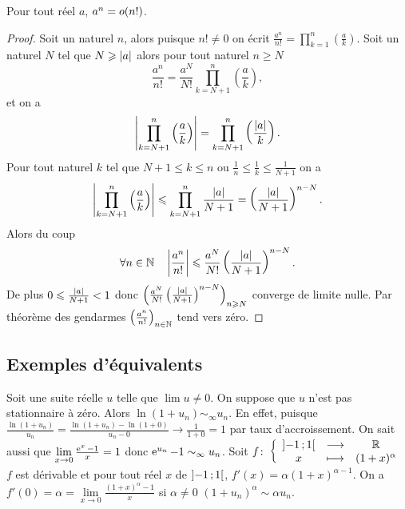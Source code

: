 \begin{prop}
  Pour tout réel \(a\), \(a^n=o\mathopen{}\left(n!\right)\).
\end{prop}
\begin{proof}
  Soit un naturel \(n\), alors puisque \(n! \neq 0\) on écrit \(\frac{a^n}{n!}=\prod_{k=1}^n \left(\frac{a}{k}\right)\). Soit un naturel \(N\) tel que \(N \geqslant \left\lvert a\right\rvert\) alors pour tout naturel \(n \geqslant N\)
  \begin{equation}
    \frac{a^n}{n!} = \frac{a^N}{N!} \prod_{k=N+1}^n \left(\frac{a}{k}\right),
  \end{equation}
  et on a
  \begin{equation}
    \left\lvert\prod_{k=N+1}^n \left(\frac{a}{k}\right)\right\rvert = \prod_{k=N+1}^n \left(\frac{\left\lvert a\right\rvert}{k}\right).
  \end{equation}
  Pour tout naturel \(k\) tel que \(N+1 \leqslant k \leqslant n\) ou \(\frac{1}{n} \leqslant \frac{1}{k} \leqslant \frac{1}{N+1}\) on a
  \begin{equation}
    \left\lvert\prod_{k=N+1}^n \left(\frac{a}{k}\right)\right\rvert \leqslant \prod_{k=N+1}^n \frac{\left\lvert a\right\rvert}{N+1} = \left(\frac{\left\lvert a\right\rvert}{N+1}\right)^{n-N}.
  \end{equation}
  Alors du coup
  \begin{equation}
    \forall n \in \mathbb{N} \quad \left\lvert\frac{a^n}{n!}\right\rvert \leqslant \frac{a^N}{N!} \left(\frac{\left\lvert a\right\rvert}{N+1}\right)^{n-N}.
  \end{equation}
  De plus \(0 \leqslant \frac{\left\lvert a\right\rvert}{N+1} < 1\) donc \(\left(\frac{a^N}{N!} \left(\frac{\left\lvert a\right\rvert}{N+1}\right)^{n-N}\right)_{n \geqslant N}\) converge de limite nulle. Par théorème des gendarmes \(\left(\frac{a^n}{n!}\right)_{n\in \mathbb{N}}\) tend vers zéro.
\end{proof}

\subsection{Exemples d'équivalents}

Soit une suite réelle \(u\) telle que \(\lim u \neq 0\). On suppose que \(u\) n'est pas stationnaire à zéro. Alors \(\ln(1+u_n) \sim_\infty u_n\). En effet, puisque \(\frac{\ln(1+u_n)}{u_n}= \frac{\ln(1+u_n) - \ln(1+0)}{u_n-0} \to \frac{1}{1+0} =1\) par taux d'accroissement. On sait aussi que \(\lim\limits_{x \to 0} \frac{\operatorname{e}^{x}-1}{x}=1\) donc \(\operatorname{e}^{u_n}-1 \sim_\infty u_n\). Soit \(f\colon \left\{\begin{array}{ccc} \left] -1 \, ;  1 \right[ & \longrightarrow &\mathbb{R}\\ x & \longmapsto & (1+x)^\alpha \end{array} \right.\) \(f\) est dérivable et pour tout réel \(x\) de \(\left] -1 \, ;  1 \right[\), \(f'(x)=\alpha(1+x)^{\alpha -1}\). On a \(f'(0)=\alpha = \lim\limits_{x \to 0}\frac{(1+x)^\alpha-1}{x}\) si \(\alpha \neq 0\) \((1+u_n)^\alpha \sim \alpha u_n\).


